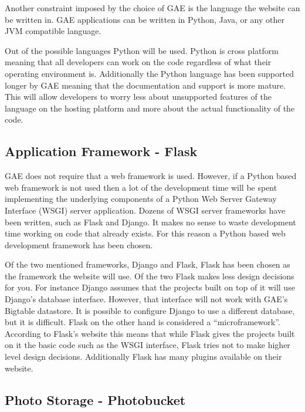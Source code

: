 \documentclass{article}
\begin{document}
Another constraint imposed by the choice of GAE is the language the website can be written in. GAE applications can
be written in Python, Java, or any other JVM compatible language. \cite{google_google_2012}

Out of the possible languages Python will be used. Python is cross platform meaning that all developers can
work on the code regardless of what their operating environment is. Additionally the Python language has been supported
longer by GAE meaning that the documentation and support is more mature. This will allow developers to worry less about
unsupported features of the language on the hosting platform and more about the actual functionality of the code.

\subsection{Application Framework - Flask}

GAE does not require that a web framework is used. However, if a Python based web framework is not used then a lot of
the development time will be spent implementing the underlying components of a Python Web Server Gateway Interface (WSGI) server application. \cite{wsgi.org_what_2012} Dozens of WSGI server frameworks have been written, such as Flask and Django. \cite{_flask_2010} \cite{_django_2012} It makes no sense to waste development time working on code that already exists. For this reason a Python based web development framework has been chosen.

Of the two mentioned frameworks, Django and Flask, Flask has been chosen as the framework the website will use. Of
the two Flask makes less design decisions for you. For instance Django assumes that the projects built on top of it will
use Django's database interface. However, that interface will not work with GAE's Bigtable datastore. It is possible to configure Django to use a different database, but it is difficult. Flask on the other hand is considered a ``microframework''.
According to Flask's website this means that while Flask gives the projects built on it the basic code such as the WSGI 
interface, Flask tries not to make higher level design decisions. Additionally Flask has many plugins available on
their website. \cite{extensions_flask_2012}

\subsection{Photo Storage - Photobucket}
\end{document}
